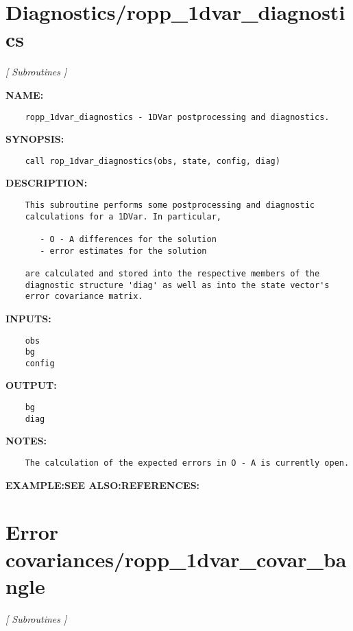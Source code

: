 \section{Diagnostics/ropp\_1dvar\_diagnostics}
\textsl{[ Subroutines ]}

\label{ch:robo11}
\label{ch:Diagnostics_ropp_1dvar_diagnostics}
\textbf{NAME:}\hspace{0.08in}\begin{Verbatim}
    ropp_1dvar_diagnostics - 1DVar postprocessing and diagnostics.
\end{Verbatim}
\textbf{SYNOPSIS:}\hspace{0.08in}\begin{Verbatim}
    call rop_1dvar_diagnostics(obs, state, config, diag)
\end{Verbatim}
\textbf{DESCRIPTION:}\hspace{0.08in}\begin{Verbatim}
    This subroutine performs some postprocessing and diagnostic
    calculations for a 1DVar. In particular,

       - O - A differences for the solution
       - error estimates for the solution

    are calculated and stored into the respective members of the
    diagnostic structure 'diag' as well as into the state vector's
    error covariance matrix.
\end{Verbatim}
\textbf{INPUTS:}\hspace{0.08in}\begin{Verbatim}
    obs
    bg
    config
\end{Verbatim}
\textbf{OUTPUT:}\hspace{0.08in}\begin{Verbatim}
    bg
    diag
\end{Verbatim}
\textbf{NOTES:}\hspace{0.08in}\begin{Verbatim}
    The calculation of the expected errors in O - A is currently open.
\end{Verbatim}
\textbf{EXAMPLE:}\hspace{0.08in}\textbf{SEE ALSO:}\hspace{0.08in}\textbf{REFERENCES:}\hspace{0.08in}\section{Error covariances/ropp\_1dvar\_covar\_bangle}
\textsl{[ Subroutines ]}

